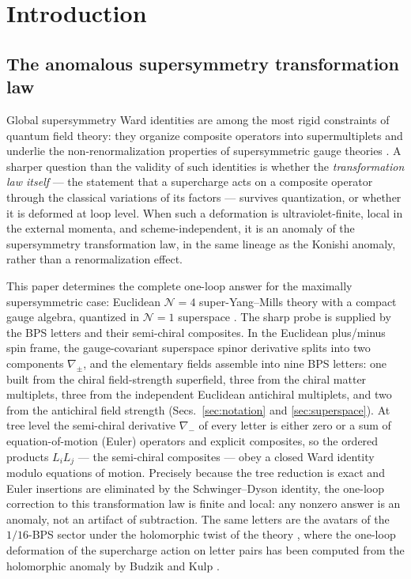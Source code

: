 \section{Introduction}\label{sec:intro}

\subsection{The anomalous supersymmetry transformation law}

Global supersymmetry Ward identities are among the most rigid constraints of quantum field theory: they organize composite
operators into supermultiplets and underlie the non-renormalization properties of supersymmetric gauge theories
\cite{WeinbergIII}. A sharper question than the validity of such identities is whether the \emph{transformation law itself}
--- the statement that a supercharge acts on a composite operator through the classical variations of its factors ---
survives quantization, or whether it is deformed at loop level. When such a deformation is ultraviolet-finite, local in the
external momenta, and scheme-independent, it is an anomaly of the supersymmetry transformation law, in the same lineage as
the Konishi anomaly, rather than a renormalization effect.

This paper determines the complete one-loop answer for the maximally supersymmetric case: Euclidean $\mathcal N=4$
super-Yang--Mills theory with a compact gauge algebra, quantized in $\mathcal N=1$ superspace \cite{GGRS}. The sharp probe
is supplied by the BPS letters and their semi-chiral composites. In the Euclidean plus/minus spin frame, the
gauge-covariant superspace spinor derivative splits into two components $\nabla_\pm$, and the elementary fields assemble
into nine BPS letters: one built from the chiral field-strength superfield, three from the chiral matter multiplets, three
from the independent Euclidean antichiral multiplets, and two from the antichiral field strength (Secs.~\ref{sec:notation}
and \ref{sec:superspace}). At tree level the semi-chiral derivative $\nabla_-$ of every letter is either zero or a sum of
equation-of-motion (Euler) operators and explicit composites, so the ordered products $L_iL_j$ --- the semi-chiral
composites --- obey a closed Ward identity modulo equations of motion. Precisely because the tree reduction is exact and
Euler insertions are eliminated by the Schwinger--Dyson identity, the one-loop correction to this transformation law is
finite and local: any nonzero answer is an anomaly, not an artifact of subtraction. The same letters are the avatars of the
$1/16$-BPS sector under the holomorphic twist of the theory \cite{Costello}, where the one-loop deformation of the
supercharge action on letter pairs has been computed from the holomorphic anomaly by Budzik and Kulp \cite{BK}.

